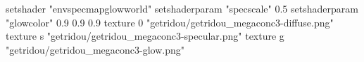 setshader "envspecmapglowworld"
setshaderparam "specscale" 0.5
setshaderparam "glowcolor" 0.9 0.9 0.9
texture 0 "getridou/getridou_megaconc3-diffuse.png"
texture s "getridou/getridou_megaconc3-specular.png"
texture g "getridou/getridou_megaconc3-glow.png"
